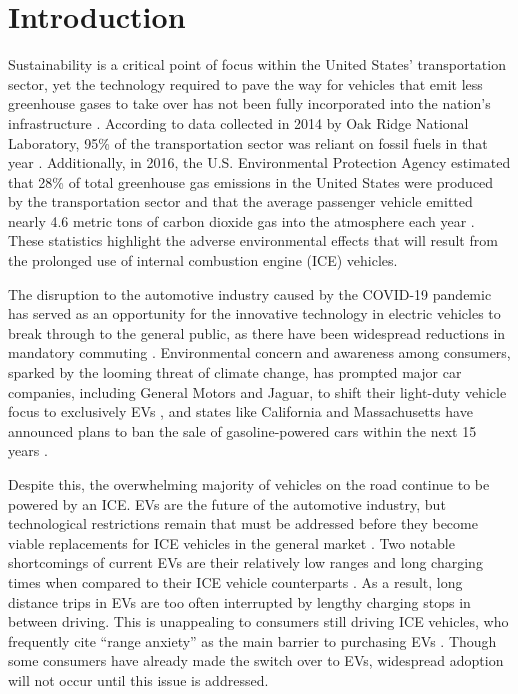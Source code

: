 
\renewcommand{\thechapter}{1}

\chapter{Introduction}

Sustainability is a critical point of focus within the United States’ transportation sector, 
yet the technology required to pave the way for vehicles that emit less greenhouse gases to 
take over has not been fully incorporated into the nation’s infrastructure \cite{onat_exploring_2017}.  
According to data collected in 2014 by Oak Ridge National Laboratory, 95\% of the transportation 
sector was reliant on fossil fuels in that year \cite{onat_exploring_2017}.  Additionally, in 2016, 
the U.S. Environmental Protection Agency estimated that 28\% of total greenhouse gas emissions 
in the United States were produced by the transportation sector and that the average passenger 
vehicle emitted nearly 4.6 metric tons of carbon dioxide gas into the atmosphere each year 
\cite{us_epa_greenhouse_2016}. These statistics highlight the adverse environmental effects that will result 
from the prolonged use of internal combustion engine (ICE) vehicles.

The disruption to the automotive industry caused by the COVID-19 pandemic has served as an 
opportunity for the innovative technology in electric vehicles to break through to the general 
public, as there have been widespread reductions in mandatory commuting \cite{arribas-ibar_risk_2021}. 
Environmental concern and awareness among consumers, sparked by the looming threat of climate 
change, has prompted major car companies, including General Motors and Jaguar, to shift their 
light-duty vehicle focus to exclusively EVs \cite{mufson_general_nodate}, and states like California and 
Massachusetts have announced plans to ban the sale of gasoline-powered cars within the next 
15 years \cite{news_gasoline_nodate}.

Despite this, the overwhelming majority of vehicles on the road continue to be powered by an ICE. 
EVs are the future of the automotive industry, but technological restrictions remain that must be 
addressed before they become viable replacements for ICE vehicles in the general market \cite{lukic_cutting_2013}. 
Two notable shortcomings of current EVs are their relatively low ranges and long charging times when compared 
to their ICE vehicle counterparts \cite{parmesh_wireless_2017}. As a result, long distance trips in EVs are too 
often interrupted by lengthy charging stops in between driving. This is unappealing to consumers still driving 
ICE vehicles, who frequently cite “range anxiety” as the main barrier to purchasing EVs 
\cite{throngnumchai_design_2013}. Though some consumers have already made the switch over to EVs, widespread adoption 
will not occur until this issue is addressed.

